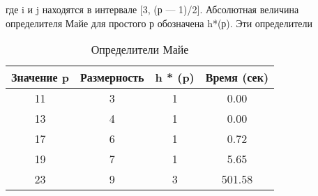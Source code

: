 где i и j находятся в интервале [3, (р — 1)/2]. Абсолютная величина
определителя Майе для простого р обозначена h*(р). Эти определители

\begin{wraptable}{l}{10cm}
\begin{tabular}{|c|c|c|c|}
\hline
Значение p & Размерность & h * (p) & Время (сек) \\ \hline
11 & 3 & 1 & 0.00 \\
13 & 4 & 1 & 0.00 \\
17 & 6 & 1 & 0.72 \\
19 & 7 & 1 & 5.65 \\
23 & 9 & 3 & 501.58 \\ \hline
\end{tabular}
\caption{Определители Майе}
\end{wraptable} 

